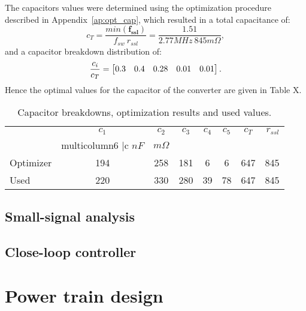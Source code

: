 The capacitors values were determined using the optimization procedure described in Appendix~\ref{ap:opt_cap}, which resulted in a total capacitance of: 
\begin{equation}
c_T = \frac{min(\mathbf{f_{ssl}})}{f_{sw}~r_{ssl}} = \frac{1.51}{2.77MHz~845m\Omega},
\end{equation}
and a capacitor breakdown distribution of:
\begin{equation}
\frac{c_i}{c_T} = \begin{bmatrix} 0.3 & 0.4 & 0.28 & 0.01 & 0.01\end{bmatrix}. 
\end{equation}
Hence the optimal values for the capacitor of the converter are given in Table X. 
\begin{table}[!h]
    \renewcommand{\arraystretch}{1.2}
    \begin{threeparttable}
    \centering
    \caption{Capacitor breakdowns, optimization results and used values.}
    \label{tab:caps_results}
    \begin{tabular}{ l | c  c  c  c  c | c | r }
                    & $c_1$   & $c_2$ & $c_3$   & $c_4$  & $c_5$ & $c_T$ &  $r_{ssl}$  \\
                    & multicolumn{6}{ |c } $nF$ &  $m\Omega$  \\
                    
    \midrule 
     Optimizer   & 194  & 258 & 181  & 6  & 6 & 647 &  845  \\
     Used        & 220  & 330 & 280  & 39  & 78 & 647 &  845  \\               
      
    \end{tabular}
    \end{threeparttable}


\subsection{Small-signal analysis}

\subsection{Close-loop controller}


\section{Power train design}

\end{table}

